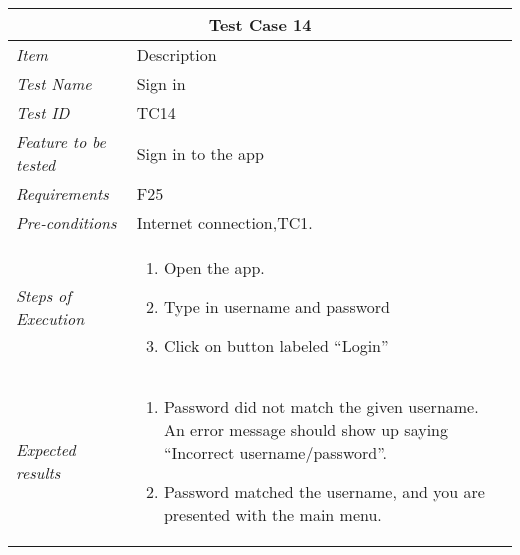 %
\begin{minipage}{\linewidth}
\setlength{\tabcolsep}{15pt}
\centering
{}
\begin{tabular}{ |l|p{70mm}| }
	\hline
	\multicolumn{2}{|c|}{\cellcolor{gray!25} \textbf{Test Case 14}} \\
	\hline
	\it{\cellcolor{gray!25}Item} & {\cellcolor{gray!25} Description } \\
	\hline
	\it{\cellcolor{gray!25}Test Name } & Sign in \\ \hline
	\it{\cellcolor{gray!25}Test ID} & TC14 \\ \hline
	\it{\cellcolor{gray!25}Feature to be tested} & Sign in to the app \\ \hline
	\it{\cellcolor{gray!25}Requirements} & F25  \\ \hline
	\it{\cellcolor{gray!25}Pre-conditions} & Internet connection,TC1. \\ \hline
	\it{\cellcolor{gray!25}Steps of Execution} & \begin{enumerate}
	                                       \item Open the app.
	                                       \item Type in username and password
	                                       \item Click on button labeled “Login”
	                                     \end{enumerate} \\ \hline
	\it{\cellcolor{gray!25}Expected results} & \begin{enumerate}[label=\alph*)]
	                                       \item Password did not match the given username. An error message should show up saying “Incorrect username/password”.
	                                       \item Password matched the username, and you are presented with the main menu.
	                                     \end{enumerate} \\
	\hline
\end{tabular}
\medskip
\end{minipage}
%
